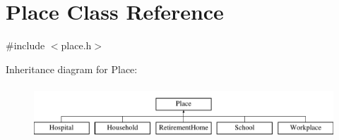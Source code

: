 \hypertarget{classPlace}{}\section{Place Class Reference}
\label{classPlace}


{\ttfamily \#include $<$place.\+h$>$}

Inheritance diagram for Place\+:\begin{figure}[H]
\begin{center}
\leavevmode
\includegraphics[height=2.000000cm]{classPlace}
\end{center}
\end{figure}

